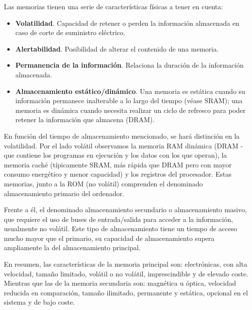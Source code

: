 \documentclass[a4paper, 11pt, titlepage]{article}
\begin{document}
        Las memorias tienen una serie de características físicas a tener en cuenta:

        \begin{itemize}
            \item \textbf{Volatilidad}. Capacidad de retener o perden la información almacenada en caso de 
            corte de suministro eléctrico.
            \item \textbf{Alertabilidad}. Posibilidad de alterar el contenido de una memoria.
            \item \textbf{Permanencia de la información}. Relaciona la duración de la información almacenada.
            \item \textbf{Almacenamiento estático/dinámico}. Una memoria es estática cuando su información 
            permanece inalterable a lo largo del tiempo (véase SRAM); una memoria es dinámica cuando necesita 
            realizar un ciclo de refresco para poder retener la información que almacena (DRAM).  
        \end{itemize}

        En función del tiempo de almacenamiento mencionado, se hará distinción en la volatilidad. Por el lado volátil 
        observamos la memoria RAM dinámica (DRAM - que contiene los programas en ejecución y los datos con los que operan), 
        la memoria caché (típicamente SRAM, más rápida que DRAM pero con mayor consumo energético y menor capacidad) y los 
        registros del procesador. Estas memorias, junto a la ROM (no volátil) comprenden el denominado almacenamiento 
        primario del ordenador.

        Frente a él, el denominado almacenamiento secundario o almacenamiento masivo, que requiere el uso de buses 
        de entrada/salida para acceder a la información, usualmente no volátil. Este tipo de almacenamiento tiene un 
        tiempo de acceso mucho mayor que el primario, su capacidad de almacenamiento supera ampliamente la del almacenamiento 
        principal.

        En resumen, las características de la memoria principal son: electrónicas, con alta velocidad, tamaño limitado, 
        volátil o no volátil, imprescindible y de elevado coste. Mientras que las de la memoria secundaria son: 
        magnética u óptica, velocidad reducida en comparación, tamaño ilimitado, permanente y estática, opcional en el sistema 
        y de bajo coste.
\end{document}
